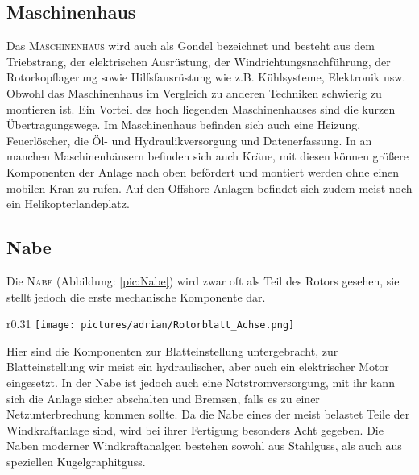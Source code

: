 \documentclass[12pt]{scrbook}
\begin{document}
\subsection{Maschinenhaus}

Das \textsc{Maschinenhaus} wird auch als Gondel bezeichnet und besteht aus dem
Triebstrang, der elektrischen Ausrüstung, der Windrichtungsnachführung,  der
Rotorkopflagerung sowie Hilfsfausrüstung wie z.B. Kühlsysteme, Elektronik usw.
Obwohl das Maschinenhaus im Vergleich zu anderen Techniken schwierig zu
montieren ist. Ein Vorteil des hoch liegenden Maschinenhauses sind die kurzen
Übertragungswege. Im Maschinenhaus befinden sich auch eine Heizung,
Feuerlöscher, die Öl- und Hydraulikversorgung und Datenerfassung. In an
manchen Maschinenhäusern befinden sich auch Kräne, mit diesen können größere
Komponenten der Anlage nach oben befördert und montiert werden ohne einen
mobilen Kran zu rufen. Auf den Offshore-Anlagen befindet sich zudem meist noch
ein Helikopterlandeplatz.

\newpage


\subsection{Nabe}

Die \textsc{Nabe} (Abbildung: \ref{pic:Nabe}) wird zwar oft als Teil des Rotors gesehen, sie stellt jedoch die
erste mechanische Komponente dar. 

\begin{wrapfigure}[12]{r}{0.31\textwidth}
	\vspace{-10pt}
	\centering
    \texttt{[image: pictures/adrian/Rotorblatt\_Achse.png]}
  	\caption{Nabe}
  	\label{pic:Nabe}
\end{wrapfigure}
Hier sind die Komponenten zur Blatteinstellung untergebracht, zur Blatteinstellung wir meist ein
hydraulischer, aber auch ein elektrischer Motor eingesetzt. In der Nabe ist
jedoch auch eine Notstromversorgung, mit ihr kann sich die Anlage sicher
abschalten und Bremsen, falls es zu einer Netzunterbrechung kommen sollte. Da
die Nabe eines der meist belastet Teile der Windkraftanlage sind, wird bei
ihrer Fertigung besonders Acht gegeben. Die Naben moderner Windkraftanalgen
bestehen sowohl aus Stahlguss, als auch aus speziellen Kugelgraphitguss.
\end{document}

